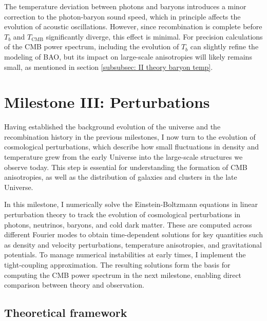 \documentclass{aa}
\numberwithin{equation}{section}
\numberwithin{table}{section}
\numberwithin{figure}{section}
\begin{document}
The temperature deviation between photons and baryons introduces a minor correction to the photon-baryon sound speed, which in principle affects the evolution of acoustic oscillations. However, since recombination is complete before $T_b$ and $T_\text{CMB}$ significantly diverge, this effect is minimal. For precision calculations of the CMB power spectrum, including the evolution of $T_b$ can slightly refine the modeling of BAO, but its impact on large-scale anisotropies will likely remains small, as mentioned in section \ref{subsubsec: II theory baryon temp}.








\section{Milestone III: Perturbations}\label{sec: milestone III}
Having established the background evolution of the universe and the recombination history in the previous milestones, I now turn to the evolution of cosmological perturbations, which describe how small fluctuations in density and temperature grew from the early Universe into the large-scale structures we observe today. This step is essential for understanding the formation of CMB anisotropies, as well as the distribution of galaxies and clusters in the late Universe. 

In this milestone, I numerically solve the Einstein-Boltzmann equations in linear perturbation theory to track the evolution of cosmological perturbations in photons, neutrinos, baryons, and cold dark matter. These are computed across different Fourier modes to obtain time-dependent solutions for key quantities such as density and velocity perturbations, temperature anisotropies, and gravitational potentials. To manage numerical instabilities at early times, I implement the tight-coupling approximation. The resulting solutions form the basis for computing the CMB power spectrum in the next milestone, enabling direct comparison between theory and observation.

\subsection{Theoretical framework}\label{subsec: III theory}
\end{document}
